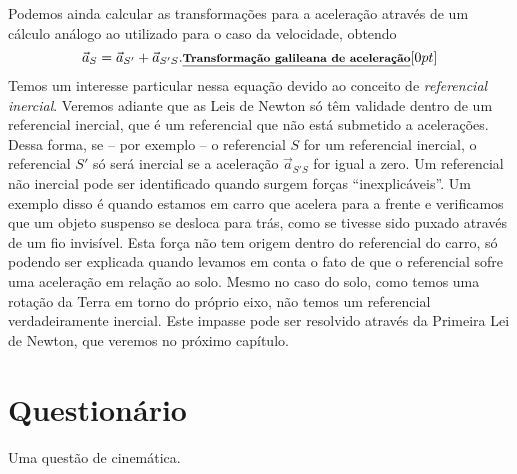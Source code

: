 Podemos ainda calcular as transformações para a aceleração através de um cálculo análogo ao utilizado para o caso da velocidade, obtendo
\begin{equation}
  \vec{a}_S = \vec{a}_{S'} + \vec{a}_{S'S}.  \relax{\footnotesize\emph{\textbf{Transformação galileana de aceleração}}}[0pt]
\end{equation}
%
Temos um interesse particular nessa equação devido ao conceito de \emph{referencial inercial}. Veremos adiante que as Leis de Newton só têm validade dentro de um referencial inercial, que é um referencial que não está submetido a acelerações. Dessa forma, se -- por exemplo -- o referencial $S$ for um referencial inercial, o referencial $S'$ só será inercial se a aceleração $\vec{a}_{S'S}$ for igual a zero. Um referencial não inercial pode ser identificado quando surgem forças ``inexplicáveis''. Um exemplo disso é quando estamos em carro que acelera para a frente e verificamos que um objeto suspenso se desloca para trás, como se tivesse sido puxado através de um fio invisível. Esta força não tem origem dentro do referencial do carro, só podendo ser explicada quando levamos em conta o fato de que o referencial sofre uma aceleração em relação ao solo. Mesmo no caso do solo, como temos uma rotação da Terra em torno do próprio eixo, não temos um referencial verdadeiramente inercial. Este impasse pode ser resolvido através da Primeira Lei de Newton, que veremos no próximo capítulo.

\section{Questionário}

\begin{question}[type={exam}]
Uma questão de cinemática.
\end{question}
